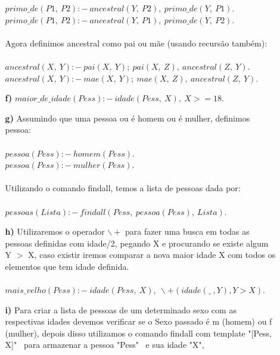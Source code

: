 \documentclass[12pt]{article}
\begin{document}
\begin{itemize}
\begin{itemize}
					$primo\_de(P1, \ P2) :- \ ancestral(Y, \ P2), \ primo\_de(Y, \ P1).$\\
					$primo\_de(P1, \ P2) :- \ ancestral(Y, \ P1), \ primo\_de(Y, \ P2).$\\ \\
					Agora definimos ancestral como pai ou mãe (usando recursão também):\\ \\
					$ancestral(X, \ Y) :- \ pai(X, \ Y); \ pai(X, \ Z), \ ancestral(Z, \ Y).$\\
					$ancestral(X, \ Y) :- \ mae(X, \ Y); \ mae(X, \ Z), \ ancestral(Z, \ Y).$
				\item[\textbf{f) }]
					\hfill\newline
					$maior\_de\_idade(Pess) :- \ idade(Pess, \ X), \ X >= 18.$\\
				\item[\textbf{g) }]
					\hfill\newline
					Assumindo que uma pessoa ou é homem ou é mulher, definimos pessoa:\\ \\
					$pessoa(Pess) :- \ homem(Pess).$\\
					$pessoa(Pess) :- \ mulher(Pess).$\\ \\
					Utilizando o comando findall, temos a lista de pessoas dada por:\\ \\
					$pessoas(Lista) :- \ findall(Pess, \ pessoa(Pess), \ Lista).$\\
				\item[\textbf{h) }]
					\hfill\newline
					Utilizaremos o operador $\backslash +$ para fazer uma busca em todas
					as pessoas definidas com idade/2, pegando X e procurando se existe
					algum Y $>$ X, caso existir iremos comparar a nova maior idade X com todos
					os elementos que tem idade definida.\\ \\
					$mais\_velho(Pess) :- \ idade(Pess, \ X), \ \backslash + (idade(\_ \ , Y), Y > X).$\\
				\item[\textbf{i) }]
					\hfill\newline
					Para criar a lista de pessoas de um determinado sexo com as respectivas idades devemos
					verificar se o Sexo passado é m (homem) ou f (mulher), depois disso utilizamos o comando
					findall com template "[Pess, X]" \ para armazenar a pessoa "Pess" \ e sua idade "X", 

\end{itemize}
\end{itemize}
\end{document}
